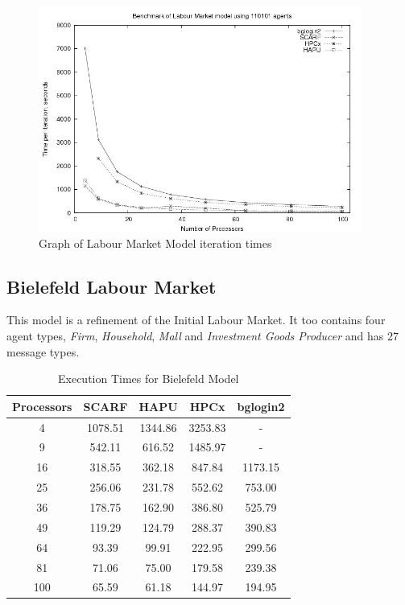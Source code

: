 \begin{figure}[ht]
 \centering
  \includegraphics[width=300pt]{Labour2-graph.jpg}
 \caption{Graph of Labour Market Model iteration times}
 \label{fig:Labour-graph1}
\end{figure}

\subsection{Bielefeld Labour Market}

This model is a refinement of the Initial Labour Market. It too contains four agent types, \textit{Firm}, \textit{Household}, \textit{Mall} and \textit{Investment Goods Producer} and has 27 message types.

{
\renewcommand{\arraystretch}{1.25}
\begin{table}[ht]
 \centering
  \begin{tabular}{c|cccc}
 Processors &SCARF &HAPU &HPCx   &bglogin2 \\ \hline
4 &1078.51 &1344.86 &3253.83 &- \\
9 &542.11 &616.52 &1485.97 &-   \\
16 &318.55 &362.18 &847.84 &1173.15     \\
25 &256.06 &231.78 &552.62 &753.00      \\
36 &178.75 &162.90 &386.80 &525.79      \\
49 &119.29 &124.79 &288.37 &390.83      \\
64 &93.39 &99.91 &222.95 &299.56        \\
81 &71.06 &75.00 &179.58 &239.38        \\
100 &65.59 &61.18 &144.97 &194.95       \\
 \end{tabular}
 \caption{Execution Times for Bielefeld Model}
 \label{tab:ExecutionTimesForBielefeld}
\end{table}
}

